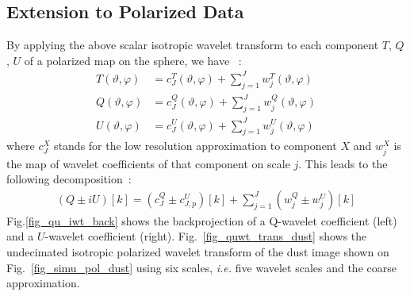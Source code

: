 \subsection{Extension to Polarized Data}
By applying the above scalar isotropic wavelet transform to each component $T$, $Q$, $U$ of a polarized map on the sphere, we have \citep{starck:pola09}~:
\begin{eqnarray}
\label{tqu_iwt}
T(\vartheta, \varphi) & = c_{J}^T (\vartheta, \varphi)+ \sum_{j=1}^{J} w_j^T  (\vartheta, \varphi)\\ \nonumber
Q(\vartheta, \varphi) & = c_{J}^Q (\vartheta, \varphi)+ \sum_{j=1}^{J} w_j^Q (\vartheta, \varphi)\\ \nonumber
U(\vartheta, \varphi) & = c_{J}^U (\vartheta, \varphi)+ \sum_{j=1}^{J} w_j^U (\vartheta, \varphi)
\end{eqnarray}
where $c_{J}^X$ stands for the low resolution approximation to component $X$ and $w_j^X$ is the map of wavelet coefficients of that component on scale $j$. This leads to the following decomposition~:
\begin{eqnarray}
(Q \pm iU)[k] =    (c^Q_{J} \pm c^U_{J,p})[k]   +   \sum_{j=1}^J   ( w_{j}^Q \pm w_{j}^U )[k]
\label{eq_qu_rec_uwt}
\end{eqnarray}
Fig.\ref{fig_qu_iwt_back} shows the backprojection of a Q-wavelet coefficient (left) and a $U$-wavelet coefficient (right).
Fig.~\ref{fig_quwt_trans_dust} shows the undecimated isotropic polarized wavelet transform of the dust image shown on 
Fig.~\ref{fig_simu_pol_dust} using six scales, \textit{i.e.} five wavelet scales and the coarse approximation.
